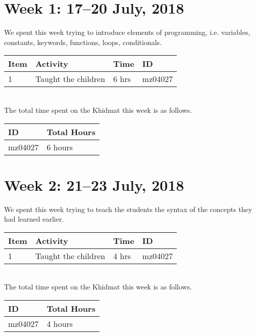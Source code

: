 \documentclass{article}
\begin{document}
\newpage %
\section*{Week 1: 17--20 July, 2018}

We spent this week trying to introduce elements of programming, i.e. variables, constants, keywords, functions, loops, conditionals.
\vspace{2.5mm} \\
\begin{tabular}{|l|l|l|l|}
  \hline
  Item 	& Activity & Time & ID \\\hline\hline
  1	& Taught the children & 6 hrs & mz04027 \\\hline
\end{tabular}
\vspace{5mm} \\
The total time spent on the Khidmat this week is as follows.
\vspace{2.5mm} \\
\begin{tabular}{|l|l|}
  \hline
  ID & Total Hours\\\hline\hline
  mz04027 & 6 hours\\\hline
\end{tabular}

\section*{Week 2: 21--23 July, 2018}
We spent this week trying to teach the students the syntax of the concepts they had learned earlier.
\vspace{0.01mm} \\
\begin{tabular}{|l|l|l|l|}
  \hline
  Item 	& Activity & Time & ID \\\hline\hline
  1	& Taught the children & 4 hrs & mz04027 \\\hline
\end{tabular}
\vspace{5mm} \\
The total time spent on the Khidmat this week is as follows.
\vspace{2.5mm} \\
\begin{tabular}{|l|l|}
  \hline
  ID & Total Hours\\\hline\hline
  mz04027 & 4 hours\\\hline
\end{tabular}
\newpage
\end{document}
